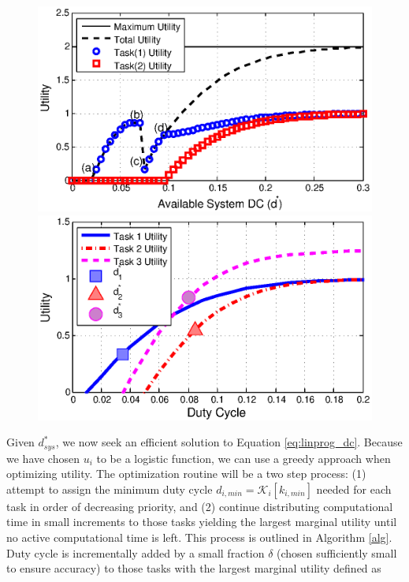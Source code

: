 \begin{figure}[t]
\centering
{\centering
\begin{minipage}{0.47\textwidth}
  \centering
\includegraphics[width=\textwidth]{figures/optimalDCexample}
\end{minipage}
\hspace{.04\textwidth}
\begin{minipage}{0.47\textwidth}
  \centering
\includegraphics[width=\textwidth]{figures/utilanddc}
\end{minipage}
}
\end{figure}

Given $d_{sys}^*$, we now seek an efficient solution to Equation \ref{eq:linprog_dc}.  Because we have chosen $u_i$ to be a logistic function, we can use a greedy approach when optimizing utility.  The optimization routine will be a two step process: (1) attempt to assign the minimum duty cycle $d_{i,min} = \mathcal{K}_i[k_{i,min}]$ needed for each task in order of decreasing priority, and (2) continue distributing computational time in small increments to those tasks yielding the largest marginal utility until no active computational time is left. This process is outlined in Algorithm \ref{alg}. Duty cycle is incrementally added by a small fraction $\delta$ (chosen sufficiently small to ensure accuracy) to those tasks with the largest marginal utility defined as 

